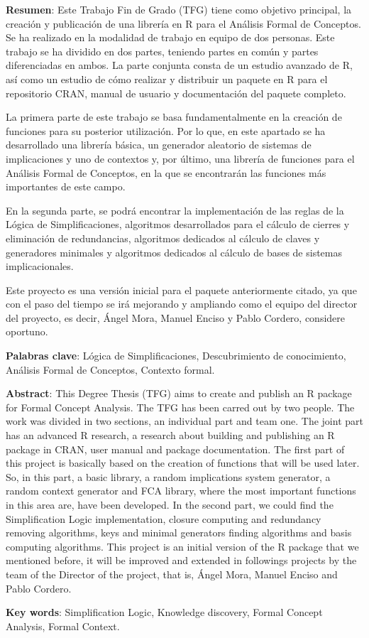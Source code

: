 \setcounter{page}{5}
\textbf{Resumen}: Este Trabajo Fin de Grado (TFG) tiene como objetivo principal, la creaci\'on y publicaci\'on de una librer\'ia 
en R para el An\'alisis Formal de Conceptos. Se ha realizado en la modalidad de trabajo en equipo de dos personas. 
Este trabajo se ha dividido en dos partes, teniendo partes en com\'un y partes diferenciadas en ambos. La parte conjunta 
consta de un estudio avanzado de R, as\'i como un estudio de c\'omo realizar y distribuir un paquete en R para el repositorio 
CRAN, manual de usuario y documentaci\'on del paquete completo. 

La primera parte de este trabajo se basa fundamentalmente en la creaci\'on de funciones para su posterior utilizaci\'on. Por lo que, en este apartado se ha desarrollado una librer\'ia b\'asica, un generador aleatorio de sistemas de implicaciones y uno de contextos y, por \'ultimo, una librer\'ia de funciones para el An\'alisis Formal de Conceptos, en la que se encontrar\'an las funciones m\'as importantes de este campo. 

En la segunda parte, se podr\'a encontrar la implementaci\'on de las reglas de la L\'ogica de Simplificaciones, algoritmos desarrollados para el c\'alculo de cierres y eliminaci\'on de redundancias, algoritmos dedicados al c\'alculo de claves y generadores minimales y algoritmos dedicados al c\'alculo de bases de sistemas implicacionales. 

Este proyecto es una versi\'on inicial para el paquete anteriormente citado, ya que con el paso del tiempo se ir\'a mejorando y ampliando como el equipo del director del proyecto, es decir, \'Angel Mora, Manuel Enciso y Pablo Cordero, considere oportuno.

\bigskip

\textbf{Palabras clave}: L\'ogica de Simplificaciones, Descubrimiento de conocimiento,  An\'alisis Formal de Conceptos, Contexto formal. 

\newpage

\textbf{Abstract}: This Degree Thesis (TFG) aims to create and publish an R package for Formal Concept Analysis. The TFG has been carred out by two people. The work was divided in two sections, an individual part and team one. The joint part has an advanced R research, a research about building and publishing an R package in CRAN, user manual and package documentation. The first part of this project is basically based on the creation of functions that will be used later. So, in this part, a basic library, a random implications system generator, a random context generator and FCA library, where the most important functions in this area are, have been developed. In the second part, we could find the Simplification Logic implementation, closure computing and redundancy removing algorithms, keys and minimal generators finding algorithms and basis computing algorithms. This project is an initial version of the R package that we mentioned before, it will be improved and extended in followings projects by the team of the Director of the project, that is, \'Angel Mora, Manuel Enciso and Pablo Cordero.

\bigskip

\textbf{Key words}: Simplification Logic, Knowledge discovery, Formal Concept Analysis, Formal Context.

\newpage

